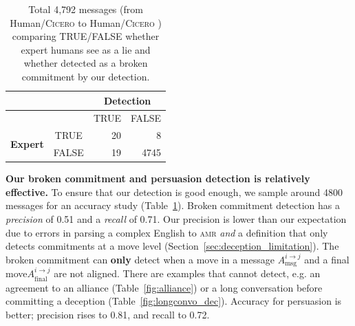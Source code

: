 \documentclass[oneside]{memoir}
\newcommand{\cicero}{\abr{Cicero} }
\newcommand{\abr}[1]{\textsc{#1}}
\begin{document}
%
\begin{table}
\centering
\begin{tabular}{ccrr}
\hline
& &\multicolumn{2}{c}{\textbf{Detection}} \\
\hline
& & TRUE & FALSE \\
\hline
\multirow{2}{*}{\textbf{Expert}} & TRUE &20 &8 \\
&FALSE &19 & 4745 \\
\hline
\end{tabular}
\caption{Total 4,792 messages (from Human/\cicero{} to Human/\cicero{}) comparing TRUE/FALSE whether expert humans see as a lie and whether detected as a broken commitment by our detection.}
\label{tab:expert_detect}
\end{table}

\textbf{Our broken commitment and persuasion detection is relatively effective.} 
% 
To ensure that our detection is good enough, we sample around 4800 messages for an accuracy study (Table~\ref{tab:expert_detect}).
%
Broken commitment detection has a \textit{precision} of 0.51 and a \textit{recall} of 0.71.
%
Our precision is lower than our expectation due to errors in parsing a complex English to \abr{amr} \emph{and} a definition that only detects commitments at a move level (Section~\ref{sec:deception_limitation}). 
%
The broken commitment can \textbf{only} detect when a move in a message $A^{i\to j}_{\text{msg}}$ and a final move$A^{i\to j}_{\text{final}}$ are not aligned.
%
There are examples that  cannot detect, e.g. an agreement
to an alliance (Table~\ref{fig:alliance}) or a long conversation
before committing a deception (Table~\ref{fig:longconvo_dec}).
%
%
Accuracy for persuasion is better;
precision rises to 0.81, and recall to 0.72.
%
\end{document}
